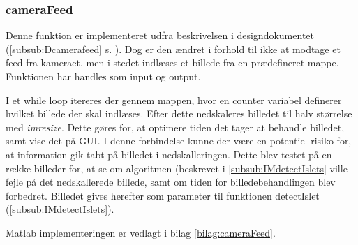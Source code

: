 \newpage
\subsubsection{cameraFeed} \label{subsub:camfeed}
Denne funktion er implementeret udfra beskrivelsen i designdokumentet (\ref{subsub:Dcamerafeed} s. \pageref{subsub:Dcamerafeed}). Dog er den ændret i forhold til ikke at modtage et feed fra kameraet, men i stedet indlæses et billede fra en prædefineret mappe. 
Funktionen har handles som input og output. 

I et while loop itereres der gennem mappen, hvor en counter variabel definerer hvilket billede der skal indlæses. Efter dette nedskaleres billedet til halv størrelse med \textit{imresize}. Dette gøres for, at optimere tiden det tager at behandle billedet, samt vise det på GUI. I denne forbindelse kunne der være en potentiel risiko for, at information gik tabt på billedet i nedskalleringen. Dette blev testet på en række billeder for, at se om algoritmen (beskrevet i \ref{subsub:IMdetectIslets} ville fejle på det nedskallerede billede, samt om tiden for billedebehandlingen blev forbedret.  Billedet gives herefter som parameter til funktionen detectIslet (\ref{subsub:IMdetectIslets}). %

Matlab implementeringen er vedlagt i bilag \ref{bilag:cameraFeed}.